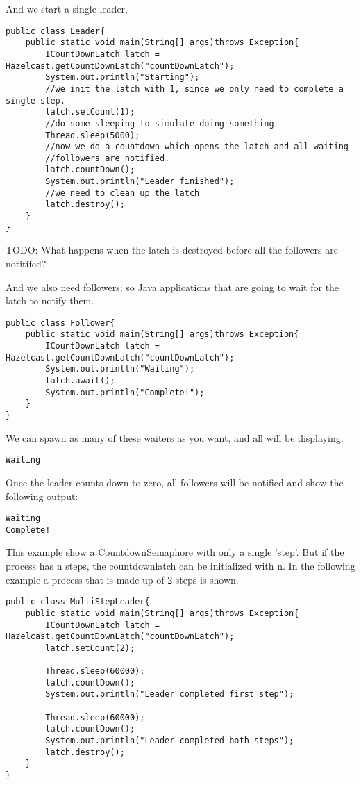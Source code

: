And we start a single leader, 
\begin{verbatim}
public class Leader{
    public static void main(String[] args)throws Exception{
        ICountDownLatch latch = Hazelcast.getCountDownLatch("countDownLatch");
        System.out.println("Starting");
        //we init the latch with 1, since we only need to complete a single step.
        latch.setCount(1); 
        //do some sleeping to simulate doing something    
        Thread.sleep(5000);
        //now we do a countdown which opens the latch and all waiting
        //followers are notified.
        latch.countDown();
        System.out.println("Leader finished");
        //we need to clean up the latch
        latch.destroy();
    }
}
\end{verbatim}

TODO: What happens when the latch is destroyed before all the followers are notitifed?

And we also need followers; so Java applications that are going to wait for the 
latch to notify them.

\begin{verbatim}
public class Follower{
    public static void main(String[] args)throws Exception{
        ICountDownLatch latch = Hazelcast.getCountDownLatch("countDownLatch");
        System.out.println("Waiting");
        latch.await();
        System.out.println("Complete!");
    }
}
\end{verbatim}
We can spawn as many of these waiters as you want, and all will be displaying.

\begin{verbatim}
Waiting
\end{verbatim}

Once the leader counts down to zero, all followers will be notified and show the following output:

\begin{verbatim}
Waiting
Complete!
\end{verbatim}

This example show a CountdownSemaphore with only a single 'step'. But if the process has n steps,
the countdownlatch can be initialized with n. In the following example a process that is made up of 2 steps is shown.

\begin{verbatim}
public class MultiStepLeader{
    public static void main(String[] args)throws Exception{
        ICountDownLatch latch = Hazelcast.getCountDownLatch("countDownLatch");
        latch.setCount(2);

        Thread.sleep(60000); 
        latch.countDown();
        System.out.println("Leader completed first step");
        
        Thread.sleep(60000); 
        latch.countDown();
        System.out.println("Leader completed both steps");
        latch.destroy();
    }
}
\end{verbatim}

